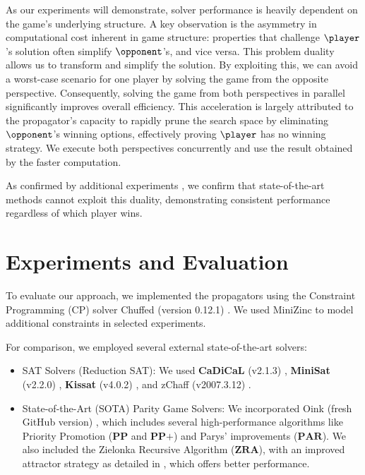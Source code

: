 \documentclass[runningheads]{llncs}
\begin{document}
As our experiments will demonstrate, solver performance is heavily dependent on the game's underlying structure. A key observation is the asymmetry in computational cost inherent in game structure: properties that challenge $\player$'s solution often simplify $\opponent$'s, and vice versa. This problem duality allows us to transform and simplify the solution. By exploiting this, we can avoid a worst-case scenario for one player by solving the game from the opposite perspective. Consequently, solving the game from both perspectives in parallel significantly improves overall efficiency. This acceleration is largely attributed to the \noc propagator's capacity to rapidly prune the search space by eliminating $\opponent$'s winning options, effectively proving $\player$ has no winning strategy. We execute both perspectives concurrently and use the result obtained by the faster computation.

As confirmed by additional experiments \cite{Hernandez:Appendix:2025}, we confirm that state-of-the-art methods cannot exploit this duality, demonstrating consistent performance regardless of which player wins.

\section{Experiments and Evaluation}\label{sec:experiments}

To evaluate our approach, we implemented the \noc propagators using the Constraint Programming (CP) solver Chuffed (version 0.12.1) \cite{chuffed:2018}. We used MiniZinc \cite{DBLP:conf/cp/NethercoteSBBDT07} to model additional constraints in selected experiments.

For comparison, we employed several external state-of-the-art solvers: 
\begin{itemize}
    \item SAT Solvers (Reduction SAT): We used \textbf{CaDiCaL} (v2.1.3) \cite{Biere:Cadical:2024}, \textbf{MiniSat} (v2.2.0) \cite{Een:MiniSat:2003}, \textbf{Kissat} (v4.0.2) \cite{Biere:Kissat:2024}, and zChaff (v2007.3.12) \cite{Moskewicz:zChaff:2001}.
    \item State-of-the-Art (SOTA) Parity Game Solvers: We incorporated Oink (fresh GitHub version) \cite{vanDijk:2018}, which includes several high-performance algorithms like Priority Promotion ($\textbf{PP}$ and $\textbf{PP+}$) and Parys' improvements ($\textbf{PAR}$). We also included the Zielonka Recursive Algorithm ($\textbf{ZRA}$), with an improved attractor strategy as detailed in \cite{Aggarwal:2023}, which offers better performance. 
\end{itemize}
\end{document}
